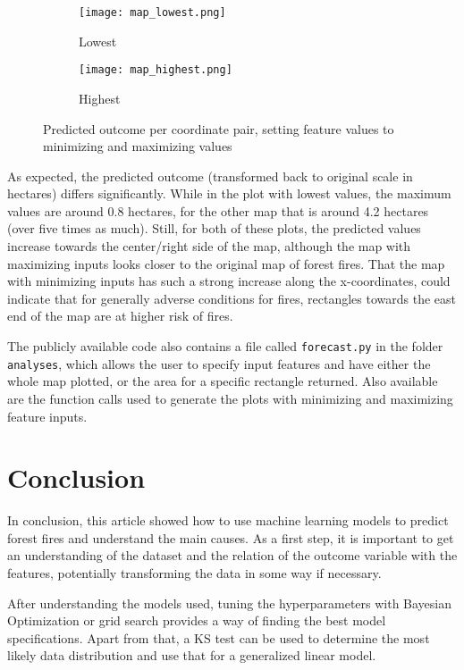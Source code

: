 \documentclass{article}
\begin{document}
\begin{figure}[!ht]
\centering 
\begin{subfigure}{0.48\textwidth} 
    \centering 
    \texttt{[image: map\_lowest.png]} 
    \caption{Lowest} 
    \label{fig:map_lowest} 
\end{subfigure} 
\begin{subfigure}{0.48\textwidth} 
    \centering
    \texttt{[image: map\_highest.png]} 
    \caption{Highest} 
    \label{fig:map_highest} 
\end{subfigure}
\caption{Predicted outcome per coordinate pair, setting feature values to minimizing and maximizing values}
\label{fig:map_high_low}
\end{figure}

As expected, the predicted outcome (transformed back to original scale in hectares) differs significantly. While in the plot with lowest values, the maximum values are around 0.8 hectares, for the other map that is around 4.2 hectares (over five times as much). Still, for both of these plots, the predicted values increase towards the center/right side of the map, although the map with maximizing inputs looks closer to the original map of forest fires. That the map with minimizing inputs has such a strong increase along the x-coordinates, could indicate that for generally adverse conditions for fires, rectangles towards the east end of the map are at higher risk of fires.

The publicly available code also contains a file called \texttt{forecast.py} in the folder \texttt{analyses}, which allows the user to specify input features and have either the whole map plotted, or the area for a specific rectangle returned. Also available are the function calls used to generate the plots with minimizing and maximizing feature inputs.

\section{Conclusion}
In conclusion, this article showed how to use machine learning models to predict forest fires and understand the main causes. As a first step, it is important to get an understanding of the dataset and the relation of the outcome variable with the features, potentially transforming the data in some way if necessary.

After understanding the models used, tuning the hyperparameters with Bayesian Optimization or grid search provides a way of finding the best model specifications. Apart from that, a KS test can be used to determine the most likely data distribution and use that for a generalized linear model.
\end{document}
